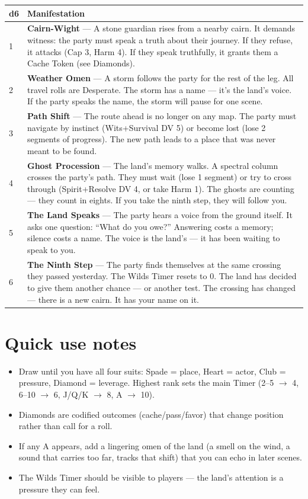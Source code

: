 \begin{longtable}{|p{1.5cm}|p{10cm}|}
\hline
\rowcolor{gray!20}
\textbf{d6} & \textbf{Manifestation} \\
\hline
1 & \textbf{Cairn-Wight} --- A stone guardian rises from a nearby cairn. It demands witness: the party must speak a truth about their journey. If they refuse, it attacks (Cap 3, Harm 4). If they speak truthfully, it grants them a Cache Token (see Diamonds). \\
\hline
2 & \textbf{Weather Omen} --- A storm follows the party for the rest of the leg. All travel rolls are Desperate. The storm has a name --- it's the land's voice. If the party speaks the name, the storm will pause for one scene. \\
\hline
3 & \textbf{Path Shift} --- The route ahead is no longer on any map. The party must navigate by instinct (Wits+Survival DV 5) or become lost (lose 2 segments of progress). The new path leads to a place that was never meant to be found. \\
\hline
4 & \textbf{Ghost Procession} --- The land's memory walks. A spectral column crosses the party's path. They must wait (lose 1 segment) or try to cross through (Spirit+Resolve DV 4, or take Harm 1). The ghosts are counting --- they count in eights. If you take the ninth step, they will follow you. \\
\hline
5 & \textbf{The Land Speaks} --- The party hears a voice from the ground itself. It asks one question: ``What do you owe?'' Answering costs a memory; silence costs a name. The voice is the land's --- it has been waiting to speak to you. \\
\hline
6 & \textbf{The Ninth Step} --- The party finds themselves at the same crossing they passed yesterday. The Wilds Timer resets to 0. The land has decided to give them another chance --- or another test. The crossing has changed --- there is a new cairn. It has your name on it. \\
\hline
\end{longtable}

\section*{Quick use notes}
\label{sec:wilderness-quick-use}
\begin{itemize}
\item Draw until you have all four suits: Spade = place, Heart = actor, Club = pressure, Diamond = leverage. Highest rank sets the main Timer (2--5 $\rightarrow$ 4, 6--10 $\rightarrow$ 6, J/Q/K $\rightarrow$ 8, A $\rightarrow$ 10).
\item Diamonds are codified outcomes (cache/pass/favor) that change position rather than call for a roll.
\item If any A appears, add a lingering omen of the land (a smell on the wind, a sound that carries too far, tracks that shift) that you can echo in later scenes.
\item The Wilds Timer should be visible to players --- the land's attention is a pressure they can feel.
\end{itemize}

